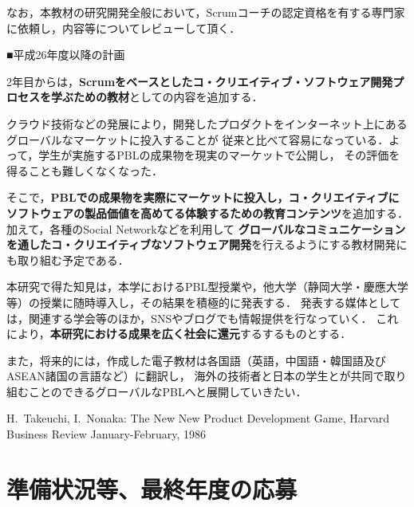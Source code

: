 \documentclass[11pt,a4paper,twoside]{jarticle}
\newcommand{\研究種別}{B}	%
\newcommand{\研究課題名}{コ・クリエイティブなソフトウェア開発者を育成するPBL型教育}
\newcommand{\研究機関名}{産業技術大学院大学}
\newcommand{\研究代表者氏名}{中鉢　欣秀}
\newcommand{\研究代表者氏名ふりがな}{ちゅうばち　よしひで}
\newcommand{\本応募effort}{\KLEffort{18}}	%
\newcommand{\研究期間の最終元号年度}{27}	%
\begin{document}
{	なお，本教材の研究開発全般において，Scrumコーチの認定資格を有する専門家に依頼し，内容等についてレビューして頂く．

	\begin{flushleft}
		■平成26年度以降の計画
	\end{flushleft}
	
	2年目からは，{\bf Scrumをベースとしたコ・クリエイティブ・ソフトウェア開発プロセスを学ぶための教材}としての内容を追加する．

	クラウド技術などの発展により，開発したプロダクトをインターネット上にあるグローバルなマーケットに投入することが
	従来と比べて容易になっている．よって，学生が実施するPBLの成果物を現実のマーケットで公開し，
	その評価を得ることも難しくなくなった．
	
	そこで，{\bf PBLでの成果物を実際にマーケットに投入し，コ・クリエイティブにソフトウェアの製品価値を高めてる体験するための教育コンテンツ}を追加する．
	加えて，各種のSocial Networkなどを利用して
	{\bf グローバルなコミュニケーションを通したコ・クリエイティブなソフトウェア開発}を行えるようにする教材開発にも取り組む予定である．

	本研究で得た知見は，本学におけるPBL型授業や，他大学（静岡大学・慶應大学等）の授業に随時導入し，その結果を積極的に発表する．
	発表する媒体としては，関連する学会等のほか，SNSやブログでも情報提供を行なっていく．
	これにより，{\bf 本研究における成果を広く社会に還元}するするものとする．
	
	また，将来的には，作成した電子教材は各国語（英語，中国語・韓国語及びASEAN諸国の言語など）に翻訳し，
	海外の技術者と日本の学生とが共同で取り組むことのできるグローバルなPBLへと展開していきたい．
	
	\vspace{1cm}
	\begin{thebibliography}{99}
		 H.~Takeuchi, I.~Nonaka: The New New Product Development Game, Harvard Business Review January-February, 1986
	\end{thebibliography}
}

\section{準備状況等、最終年度の応募}
\end{document}
